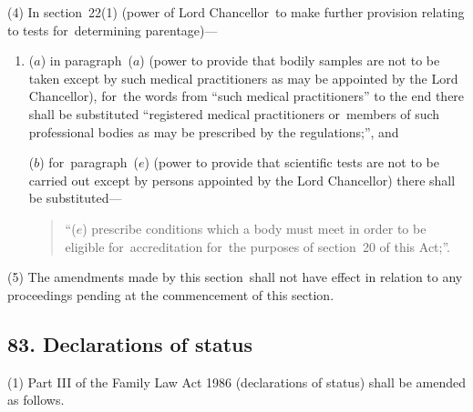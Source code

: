 \documentclass[12pt,a4paper]{article}
\begin{document}
(4) In section~22(1)  (power of Lord Chancellor~to make further provision relating to tests for~determining parentage)—
\begin{enumerate}\item[]
($a$) in paragraph~($a$)  (power to provide that bodily samples are not to be taken except by such medical practitioners as may be appointed by the Lord Chancellor), for~the words from “such medical practitioners” to the end there shall be substituted “registered medical practitioners or~members of such professional bodies as may be prescribed by the regulations;”, and

($b$) for~paragraph~($e$)  (power to provide that scientific tests are not to be carried out except by persons appointed by the Lord Chancellor) there shall be substituted—
\begin{quotation}
“($e$) prescribe conditions which a body must meet in order to be eligible for~accreditation for~the purposes of section~20 of this Act;”.
\end{quotation}
\end{enumerate}

(5) The amendments made by this section~shall not have effect in relation to any proceedings pending at the commencement of this section.

\subsection{83. Declarations of status}

(1) Part III of the Family Law Act 1986 (declarations of status) shall be amended as follows.
\end{document}
